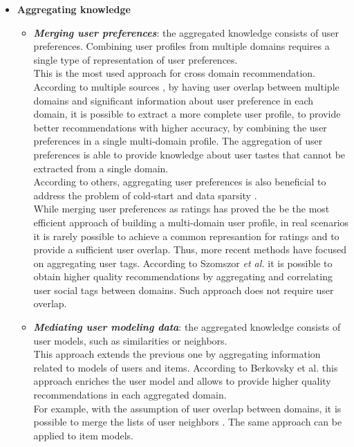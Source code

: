 \begin{itemize}
\item \textbf{Aggregating knowledge}
\begin{itemize}
\item \textbf{\textit{Merging user preferences}}: the aggregated knowledge consists of user preferences. Combining user profiles from multiple domains requires a single type of representation of user preferences.\\
This is the most used approach for cross domain recommendation. According to multiple sources \cite{10.1007/s11257-012-9131-2, 10.1007/978-3-540-88564-1_40, 10.1007/978-3-540-73078-1_44, 10.1145/1297231.1297238, 10.1007/s00354-008-0041-0}, by having user overlap between multiple domains and significant information about user preference in each domain, it is possible to extract a more complete user profile, to provide better recommendations with higher accuracy, by combining the user preferences in a single multi-domain profile. The aggregation of user preferences is able to provide knowledge about user tastes that cannot be extracted from a single domain.\\
According to others, aggregating user preferences is also beneficial to address the problem of cold-start \cite{10.1007/978-3-642-38844-6_25} and data sparsity \cite{10.1007/s11257-012-9128-x}.\\
While merging user preferences as ratings has proved the be the most efficient approach of building a multi-domain user profile, in real scenarios it is rarely possible to achieve a common represantion for ratings and to provide a sufficient user overlap. Thus, more recent methods have focused on aggregating user tags. According to Szomszor \textit{et al.} \cite{10.1145/1379092.1379103, 10.1007/978-3-540-88564-1_40} it is possible to obtain higher quality recommendations by aggregating and correlating user social tags between domains. Such approach does not require user overlap.
\item \textbf{\textit{Mediating user modeling data}}: the aggregated knowledge consists of user models, such as similarities or neighbors.\\
This approach extends the previous one by aggregating information related to models of users and items. According to Berkovsky et al. \cite{10.1007/s11257-007-9042-9, 10.1007/11590323_22} this approach enriches the user model and allows to provide higher quality recommendations in each aggregated domain.\\
For example, with the assumption of user overlap between domains, it is possible to merge the lists of user neighbors \cite{10.1145/1297231.1297238}. The same approach can be applied to item models.

\end{itemize}
\end{itemize}
